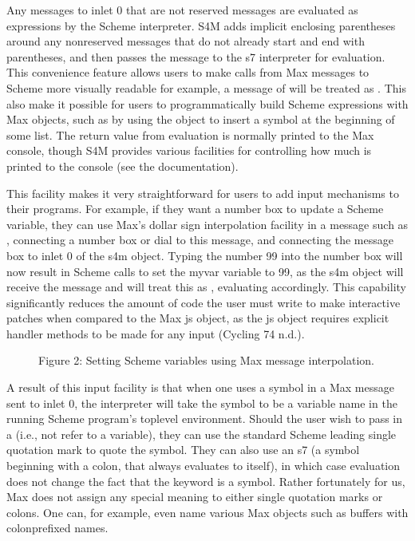 \documentclass[letterpaper,10pt,english]{sphinxmanual}
\begin{document}
\sphinxAtStartPar
Any messages to inlet 0 that are not reserved messages are evaluated as expressions by the Scheme interpreter.
S4M adds implicit enclosing parentheses around any non\sphinxhyphen{}reserved messages that do not already start
and end with parentheses, and then passes the message to the s7 interpreter for evaluation.
This convenience feature allows users to make calls from Max messages to Scheme more visually readable \sphinxhyphen{} for example,
a message of  will be treated as . This also make it possible for users
to programmatically build Scheme expressions with Max objects, such as by using the  object to insert
a symbol at the beginning of some list.
The return value from evaluation is normally printed to the Max console, though S4M provides various facilities for controlling
how much is printed to the console (see the documentation).

\sphinxAtStartPar
This facility makes it very straightforward for users to add input mechanisms to their programs.
For example, if they want a number box to update a Scheme variable, they can use Max’s dollar sign interpolation facility
in a message such as , connecting a number box or dial to this message, and connecting the message box to inlet 0
of the s4m object.
Typing the number 99 into the number box will now result in Scheme calls to set the my\sphinxhyphen{}var variable to 99, as the s4m object
will receive the message  and will treat this as , evaluating accordingly.
This capability significantly reduces the amount of code the user must write to make interactive patches when compared to the Max js object,
as the js object requires explicit handler methods to be made for any input (Cycling 74 n.d.).

\begin{figure}[htbp]
\centering
\capstart

\noindent{}
\caption{Figure 2: Setting Scheme variables using Max message interpolation.}\label{\detokenize{features_usage:id1}}\end{figure}

\sphinxAtStartPar
A result of this input facility is that when one uses a symbol in a Max message sent to inlet 0, the interpreter will take the symbol
to be a variable name in the running Scheme program’s top\sphinxhyphen{}level environment.
Should the user wish to pass in a  (i.e., not refer to a variable), they can use the standard Scheme leading single
quotation mark to quote the symbol.
They can also use an s7  (a symbol beginning with a colon, that always evaluates to itself), in which case evaluation
does not change the fact that the keyword is a symbol.
Rather fortunately for us, Max does not assign any special meaning to either single quotation marks or colons.
One can, for example, even name various Max objects such as buffers with colon\sphinxhyphen{}prefixed names.
\end{document}
